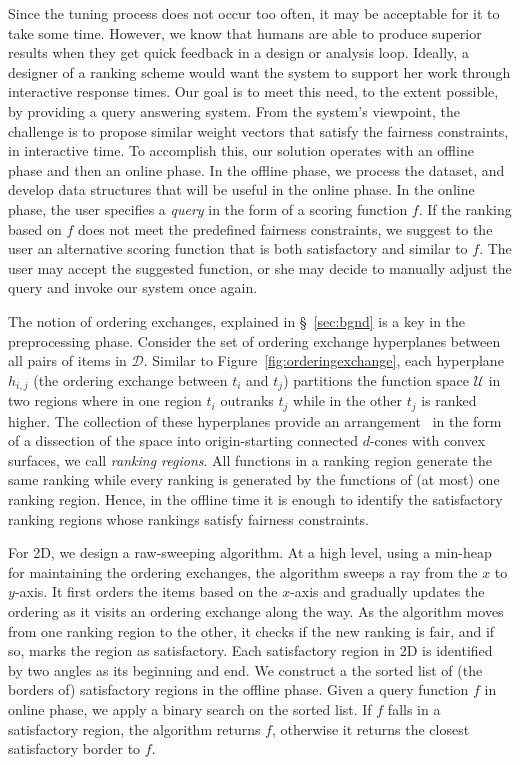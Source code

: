Since the tuning process does not occur too often, it may be acceptable for it to take some time. However, we know that humans are able to produce superior results when they get quick feedback in a design or analysis loop.  Ideally, a  designer of a ranking scheme would want the system to support her work through interactive response times.  Our goal is to meet this need, to the extent possible, by providing a query answering system. From the system's viewpoint, the challenge is to propose similar weight vectors that satisfy the fairness constraints, in interactive time.  To accomplish this, our solution operates with an offline phase and then an online phase.  In the offline phase, we process the dataset, and develop data structures that will be useful in the online phase. 
In the online phase, the user specifies a {\em query} in the form of a scoring function $f$.
If the ranking based on $f$ does not meet the predefined fairness constraints, we suggest to the user an alternative scoring function that is both satisfactory and similar to $f$. The user may accept the suggested function, or she may decide to manually adjust the query and invoke our system once again.

The notion of ordering exchanges, explained in \S~\ref{sec:bgnd} is a key in the preprocessing phase.
Consider the set of ordering exchange hyperplanes between all pairs of items in $\mathcal{D}$.
Similar to Figure~\ref{fig:orderingexchange}, each hyperplane $h_{i,j}$ (the ordering exchange between $t_i$ and $t_j$) partitions the function space $\mathcal{U}$ in two regions where in one region $t_i$ outranks $t_j$ while in the other $t_j$ is ranked higher.
The collection of these hyperplanes provide an arrangement~\cite{redlining} in the form of a dissection of the space into origin-starting connected $d$-cones with convex surfaces, we call {\em ranking regions}. All functions in a ranking region generate the same ranking while every ranking is generated by the functions of (at most) one ranking region.
Hence, in the offline time it is enough to identify the satisfactory ranking regions whose rankings satisfy fairness constraints.

For 2D, we design a raw-sweeping algorithm. At a high level, using a min-heap for maintaining the ordering exchanges, the algorithm sweeps a ray from the $x$ to $y$-axis.
It first orders the items based on the $x$-axis and gradually updates the ordering as it visits an ordering exchange along the way. As the algorithm moves from one ranking region to the other, it checks if the new ranking is fair, and if so, marks the region as satisfactory.
Each satisfactory region in 2D is identified by two angles as its beginning and end.
We construct a the sorted list of (the borders of) satisfactory regions in the offline phase.
Given a query function $f$ in online phase, we apply a binary search on the sorted list. If $f$ falls in a satisfactory region, the algorithm returns $f$, otherwise it returns the closest satisfactory border to $f$.

